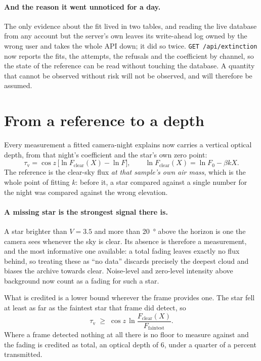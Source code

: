 \documentclass[11pt,a4paper]{article}
\begin{document}
\paragraph{And the reason it went unnoticed for a day.} The only evidence about
the fit lived in two tables, and reading the live database from any account but
the server's own leaves its write-ahead log owned by the wrong user and takes
the whole API down; it did so twice. \texttt{GET /api/extinction} now reports
the fits, the attempts, the refusals and the coefficient by channel, so the
state of the reference can be read without touching the database. A quantity
that cannot be observed without risk will not be observed, and will therefore be
assumed.

\section{From a reference to a depth}
\label{sec:depth}

Every measurement a fitted camera-night explains now carries a vertical optical
depth, from that night's coefficient and the star's own zero point:
\[
  \tau_{\mathrm v} = \cos z\,\bigl[\ln F_{\mathrm{clear}}(X) - \ln F\bigr],
  \qquad \ln F_{\mathrm{clear}}(X) = \ln F_0 - \beta k X .
\]
The reference is the clear-sky flux \emph{at that sample's own air mass}, which
is the whole point of fitting $k$: before it, a star compared against a single
number for the night was compared against the wrong elevation.

\paragraph{A missing star is the strongest signal there is.} A star brighter
than $V=\num{3.5}$ and more than \SI{20}{\degree} above the horizon is one the
camera sees whenever the sky is clear. Its absence is therefore a measurement,
and the most informative one available: a total fading leaves exactly no flux
behind, so treating these as ``no data'' discards precisely the deepest cloud
and biases the archive towards clear. Noise-level and zero-level intensity above
background now count as a fading for such a star.

What is credited is a lower bound wherever the frame provides one. The star fell
at least as far as the faintest star that frame did detect, so
\[
  \tau_{\mathrm v} \;\ge\; \cos z\,\ln\frac{F_{\mathrm{clear}}(X)}{F_{\mathrm{faintest}}} .
\]
Where a frame detected nothing at all there is no floor to measure against and
the fading is credited as total, an optical depth of 6, under a quarter of a
percent transmitted.
\end{document}
